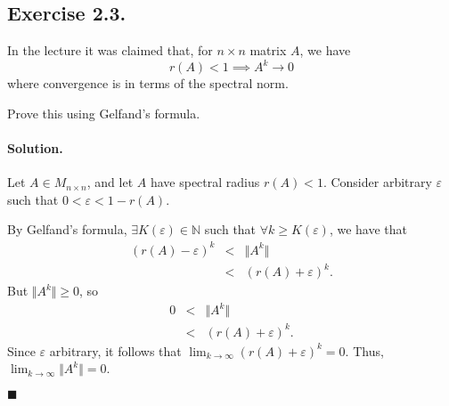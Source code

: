\documentclass[11pt]{article}
\begin{document}
    \subsection*{Exercise 2.3.}\label{exercise-2.3.}

    In the lecture it was claimed that, for \(n\times n\) matrix \(A\), we
have \[
r(A)<1\implies A^{k}\to0
\] where convergence is in terms of the spectral norm.

Prove this using Gelfand's formula.

    \paragraph{Solution.}\label{solution.}

Let \(A\in M_{n\times n}\), and let \(A\) have spectral radius
\(r(A)<1\). Consider arbitrary \(\varepsilon\) such that
\(0<\varepsilon<1-r(A)\).

By Gelfand's formula, \(\exists K(\varepsilon)\in\mathbb{N}\) such that
\(\forall k\geq K(\varepsilon)\), we have that \[
\begin{eqnarray*}
(r(A)-\varepsilon)^{k} &<& \Vert A^{k} \Vert \\
&<& (r(A)+\varepsilon)^{k}.
\end{eqnarray*}
\] But \(\Vert A^{k} \Vert \geq 0\), so \[
\begin{eqnarray*}
0 &<& \Vert A^{k} \Vert \\
&<& (r(A)+\varepsilon)^{k}.
\end{eqnarray*}
\] Since \(\varepsilon\) arbitrary, it follows that
\(\lim_{k\to\infty} (r(A)+\varepsilon)^{k}=0\). Thus,
\(\lim_{k\to\infty} \Vert A^k \Vert = 0\).

\(\blacksquare\)


    
    
    
    
\end{document}
